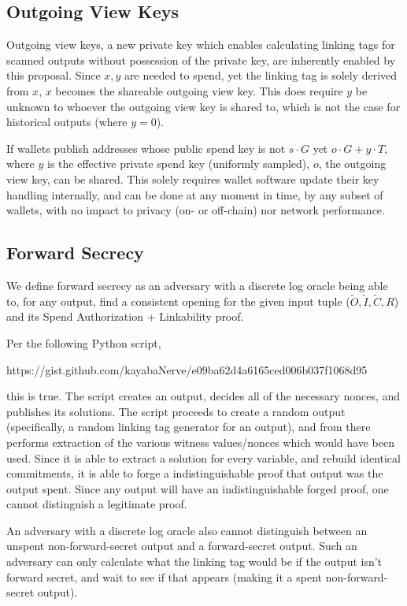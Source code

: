 \documentclass[]{article}
\begin{document}
\subsection{Outgoing View Keys}

Outgoing view keys, a new private key which enables calculating linking tags for scanned outputs without possession of the private key, are inherently enabled by this proposal. Since $x, y$ are needed to spend, yet the linking tag is solely derived from $x$, $x$ becomes the shareable outgoing view key. This does require $y$ be unknown to whoever the outgoing view key is shared to, which is not the case for historical outputs (where $y = 0$).

If wallets publish addresses whose public spend key is not $s \cdot G$ yet $o \cdot G + y \cdot T$, where $y$ is the effective private spend key (uniformly sampled), $o$, the outgoing view key, can be shared. This solely requires wallet software update their key handling internally, and can be done at any moment in time, by any subset of wallets, with no impact to privacy (on- or off-chain) nor network performance.

\subsection{Forward Secrecy}

We define forward secrecy as an adversary with a discrete log oracle being able to, for any output, find a consistent opening for the given input tuple ($\tilde{O}, \tilde{I}, \tilde{C}, R$) and its Spend Authorization + Linkability proof.

Per the following Python script,

https://gist.github.com/kayabaNerve/e09ba62d4a6165ced006b037f1068d95

this is true. The script creates an output, decides all of the necessary nonces, and publishes its solutions. The script proceeds to create a random output (specifically, a random linking tag generator for an output), and from there performs extraction of the various witness values/nonces which would have been used. Since it is able to extract a solution for every variable, and rebuild identical commitments, it is able to forge a indistinguishable proof that output was the output spent. Since any output will have an indistinguishable forged proof, one cannot distinguish a legitimate proof.

An adversary with a discrete log oracle also cannot distinguish between an unspent non-forward-secret output and a forward-secret output. Such an adversary can only calculate what the linking tag would be if the output isn't forward secret, and wait to see if that appears (making it a spent non-forward-secret output).
\end{document}

